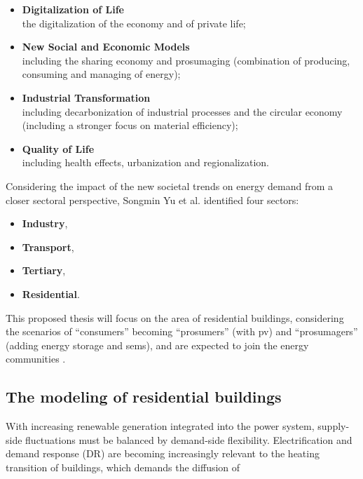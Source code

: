 \begin{itemize}
  \item \textbf{Digitalization of Life} \\ the digitalization of the economy and of private life;
  \item \textbf{New Social and Economic Models} \\ including the sharing economy and prosumaging (combination of producing, consuming and managing of energy);
  \item \textbf{Industrial Transformation} \\ including decarbonization of industrial processes and the circular economy (including a stronger focus on material efficiency);
  \item \textbf{Quality of Life} \\ including health effects, urbanization and regionalization. 
\end{itemize}

Considering the impact of the new societal trends on energy demand from a closer sectoral perspective,
Songmin Yu et al. \cite{newtrends} identified four sectors: 

\begin{itemize}
  \item \textbf{Industry}, 
  \item \textbf{Transport}, 
  \item \textbf{Tertiary}, 
  \item \textbf{Residential}. 
\end{itemize}

This proposed thesis will focus on the area of residential buildings,
considering the scenarios of “consumers” becoming “prosumers” (with \gls{pv}) and “prosumagers” (adding energy storage and \gls{sems}),
and are expected to join the energy communities \cite{consumer}.  


\subsection{The modeling of residential buildings}

With increasing renewable generation integrated into the power system, supply-side fluctuations must be balanced by demand-side flexibility. 
Electrification and demand response (DR) are becoming increasingly relevant to the heating transition of buildings, which demands the diffusion of

